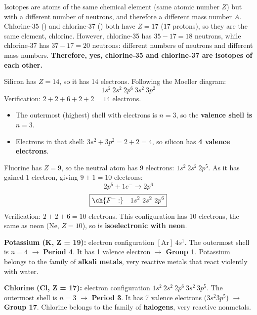 \documentclass[11pt,a4paper]{article}
\begin{document}
\begin{solucioneng}
Isotopes are atoms of the same chemical element (same atomic number $Z$) but with a different number of neutrons, and therefore a different mass number $A$. Chlorine-35 () and chlorine-37 () both have $Z = 17$ (17 protons), so they are the same element, chlorine. However, chlorine-35 has $35 - 17 = 18$ neutrons, while chlorine-37 has $37 - 17 = 20$ neutrons: different numbers of neutrons and different mass numbers. \textbf{Therefore, yes, chlorine-35 and chlorine-37 are isotopes of each other.}
\end{solucioneng}

\begin{solucioneng}
Silicon has $Z = 14$, so it has 14 electrons. Following the Moeller diagram:
\[
1s^2\ 2s^2\ 2p^6\ 3s^2\ 3p^2
\]
Verification: $2+2+6+2+2 = 14$ electrons. \checkmark
\begin{itemize}
    \item The outermost (highest) shell with electrons is $n = 3$, so the \textbf{valence shell is $n = 3$}.
    \item Electrons in that shell: $3s^2 + 3p^2 = 2 + 2 = 4$, so silicon has \textbf{4 valence electrons}.
\end{itemize}
\end{solucioneng}

\begin{solucioneng}
Fluorine has $Z = 9$, so the neutral atom has 9 electrons: $1s^2\ 2s^2\ 2p^5$. As  it has gained 1 electron, giving $9 + 1 = 10$ electrons:
\[
2p^5 + 1e^- \rightarrow 2p^6
\]
\[
\boxed{\ch{F^{-}:} \quad 1s^2\ 2s^2\ 2p^6}
\]
Verification: $2+2+6 = 10$ electrons. \checkmark
This configuration has 10 electrons, the same as neon (Ne, $Z=10$), so  is \textbf{isoelectronic with neon}.
\end{solucioneng}

\begin{solucioneng}
\textbf{Potassium (K, Z = 19):} electron configuration $[\text{Ar}]\ 4s^1$. The outermost shell is $n = 4$ $\rightarrow$ \textbf{Period 4}. It has 1 valence electron $\rightarrow$ \textbf{Group 1}. Potassium belongs to the family of \textbf{alkali metals}, very reactive metals that react violently with water.

\textbf{Chlorine (Cl, Z = 17):} electron configuration $1s^2\ 2s^2\ 2p^6\ 3s^2\ 3p^5$. The outermost shell is $n = 3$ $\rightarrow$ \textbf{Period 3}. It has 7 valence electrons ($3s^2 3p^5$) $\rightarrow$ \textbf{Group 17}. Chlorine belongs to the family of \textbf{halogens}, very reactive nonmetals.
\end{solucioneng}
\end{document}
